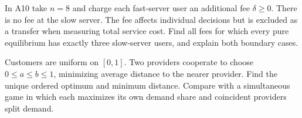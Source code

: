 In A10 take $n=8$ and charge each fast-server user an additional fee $\delta\ge0$. There is no fee at the slow server. The fee affects individual decisions but is excluded as a transfer when measuring total service cost. Find all fees for which every pure equilibrium has exactly three slow-server users, and explain both boundary cases.

Customers are uniform on $[0,1]$. Two providers cooperate to choose $0\le a\le b\le1$, minimizing average distance to the nearer provider. Find the unique ordered optimum and minimum distance. Compare with a simultaneous game in which each maximizes its own demand share and coincident providers split demand.
